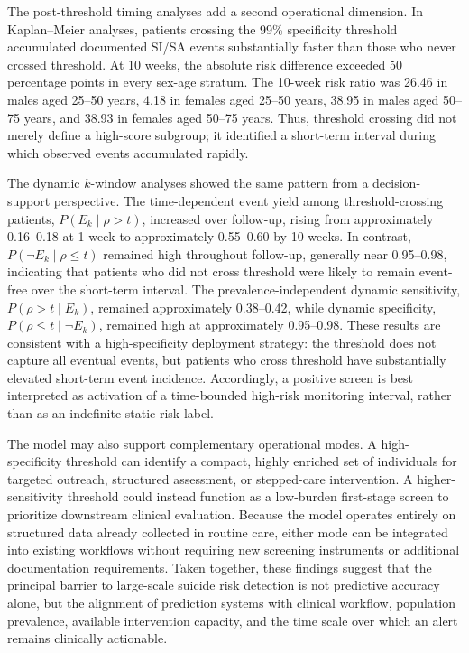 \documentclass[onecolumn, compsoc,11pt]{IEEEtran}
\begin{document}
The post-threshold timing analyses add a second operational dimension. In Kaplan--Meier analyses, patients crossing the 99\% specificity threshold accumulated documented SI/SA events substantially faster than those who never crossed threshold. At 10 weeks, the absolute risk difference exceeded 50 percentage points in every sex-age stratum. The 10-week risk ratio was 26.46 in males aged 25--50 years, 4.18 in females aged 25--50 years, 38.95 in males aged 50--75 years, and 38.93 in females aged 50--75 years. Thus, threshold crossing did not merely define a high-score subgroup; it identified a short-term interval during which observed events accumulated rapidly.

The dynamic \(k\)-window analyses showed the same pattern from a decision-support perspective. The time-dependent event yield among threshold-crossing patients, \(P(E_k\mid \rho>t)\), increased over follow-up, rising from approximately 0.16--0.18 at 1 week to approximately 0.55--0.60 by 10 weeks. In contrast, \(P(\neg E_k\mid \rho\leq t)\) remained high throughout follow-up, generally near 0.95--0.98, indicating that patients who did not cross threshold were likely to remain event-free over the short-term interval. The prevalence-independent dynamic sensitivity, \(P(\rho>t\mid E_k)\), remained approximately 0.38--0.42, while dynamic specificity, \(P(\rho\leq t\mid \neg E_k)\), remained high at approximately 0.95--0.98. These results are consistent with a high-specificity deployment strategy: the threshold does not capture all eventual events, but patients who cross threshold have substantially elevated short-term event incidence. Accordingly, a positive screen is best interpreted as activation of a time-bounded high-risk monitoring interval, rather than as an indefinite static risk label.

The model may also support complementary operational modes. A high-specificity threshold can identify a compact, highly enriched set of individuals for targeted outreach, structured assessment, or stepped-care intervention. A higher-sensitivity threshold could instead function as a low-burden first-stage screen to prioritize downstream clinical evaluation. Because the model operates entirely on structured data already collected in routine care, either mode can be integrated into existing workflows without requiring new screening instruments or additional documentation requirements. Taken together, these findings suggest that the principal barrier to large-scale suicide risk detection is not predictive accuracy alone, but the alignment of prediction systems with clinical workflow, population prevalence, available intervention capacity, and the time scale over which an alert remains clinically actionable.
\end{document}
